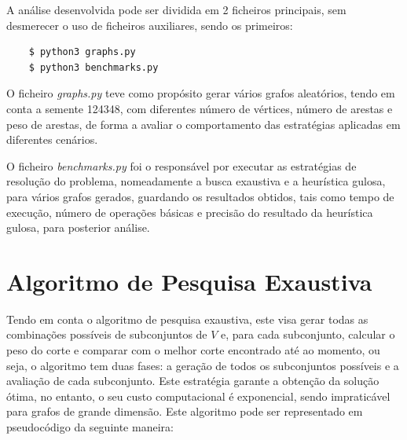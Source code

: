 \documentclass[mirror]{revdetua}
\begin{document}
A análise desenvolvida pode ser dividida em 2 ficheiros principais, sem desmerecer o uso de ficheiros auxiliares, sendo os primeiros:
\begin{verbatim}
    $ python3 graphs.py
    $ python3 benchmarks.py
\end{verbatim}

O ficheiro \textit{graphs.py} teve como propósito gerar vários grafos aleatórios, tendo em conta a semente 124348, com diferentes número de vértices, número de arestas e peso de arestas, de forma a avaliar o comportamento das estratégias aplicadas em diferentes cenários.

O ficheiro \textit{benchmarks.py} foi o responsável por executar as estratégias de resolução do problema, nomeadamente a busca exaustiva e a heurística gulosa, para vários grafos gerados, guardando os resultados obtidos, tais como tempo de execução, número de operações básicas e precisão do resultado da heurística gulosa, para posterior análise.


\section{Algoritmo de Pesquisa Exaustiva}

Tendo em conta o algoritmo de pesquisa exaustiva, este visa gerar todas as combinações possíveis de subconjuntos de $V$ e, para cada subconjunto, calcular o peso do corte e comparar com o melhor corte encontrado até ao momento, ou seja, o algoritmo tem duas fases: a geração de todos os subconjuntos possíveis e a avaliação de cada subconjunto. Este estratégia garante a obtenção da solução ótima, no entanto, o seu custo computacional é exponencial, sendo impraticável para grafos de grande dimensão. Este algoritmo pode ser representado em pseudocódigo da seguinte maneira:
\end{document}
